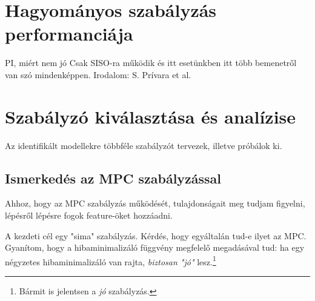 \section{Hagyományos szabályzás performanciája}

PI, miért nem jó
Csak SISO-ra működik és itt esetünkben itt több bemenetről van szó mindenképpen. Irodalom: S. Prívara et al. 

\section{Szabályzó kiválasztása és analízise}


Az identifikált modellekre többféle szabályzót tervezek, illetve próbálok ki.

\subsection{Ismerkedés az MPC szabályzással}

Ahhoz, hogy az MPC szabályzás működését, tulajdonságait meg tudjam figyelni, lépésről lépésre fogok feature-öket hozzáadni.

A kezdeti cél egy "sima" szabályzás. Kérdés, hogy egyáltalán tud-e ilyet az MPC. Gyanítom, hogy a hibaminimalizáló függvény megfelelő megadásával tud: ha egy négyzetes hibaminimalizáló van rajta, \textit{biztosan "jó"} lesz.\footnote{Bármit is jelentsen a \textit{jó} szabályzás.}

